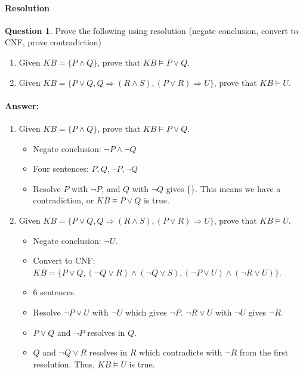 \documentclass[11pt,a4paper]{article}
\theoremstyle{definition}%
\newtheorem{Q}{Question}[] %
\newcommand{\reponse}[1]{%
\ifthenelse {\boolean{corrige}} {\paragraph{Answer:} \color{darkblue}   #1\color{black}} {}
}
\begin{document}
\paragraph{Resolution}
\begin{Q}
    Prove the following using resolution (negate conclusion, convert to CNF, prove contradiction)
    \begin{enumerate}
        \item Given $KB = \{P \wedge Q\}$, prove that $KB \models P \vee Q$.
        \item Given $KB = \{P \vee Q, Q \Rightarrow (R \wedge S), (P \vee R) \Rightarrow U \}$, prove that $KB \models U$.

    \end{enumerate}

    \reponse{
    \begin{enumerate}
        \item Given $KB = \{P \wedge Q\}$, prove that $KB \models P \vee Q$.

            \begin{itemize}
                \item Negate conclusion: $\neg P \wedge \neg Q$
                \item Four sentences: $P, Q, \neg P, \neg Q$
                \item Resolve $P$ with $\neg P$, and $Q$ with $\neg Q$ gives \{\}. This means we have
                    a contradiction, or $KB \models P \vee Q$ is true.
            \end{itemize}

        \item Given $KB = \{P \vee Q, Q \Rightarrow (R \wedge S), (P \vee R) \Rightarrow U \}$, prove that $KB \models U$.
            \begin{itemize}
                \item Negate conclusion: $\neg U$.
                \item Convert to CNF: $KB = \{P \vee Q, (\neg Q \vee R) \wedge (\neg Q \vee S), (\neg P \vee U) \wedge (\neg R \vee U) \}$.
                \item 6 sentences.
                \item Resolve $\neg P \vee U$ with $\neg U$ which gives $\neg P$. $\neg R \vee U$ with $\neg U$ gives
                    $\neg R$.
                \item $P \vee Q$ and $\neg P$ resolves in $Q$.
                \item $Q$ and $\neg Q \vee R$ resolves in $R$ which contradicts with $\neg R$ from the first
                    resolution. Thus, $KB \models U$ is true.
            \end{itemize}

    \end{enumerate}

    }
\end{Q}
\end{document}
